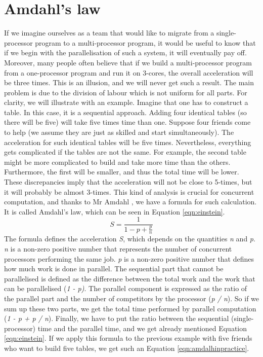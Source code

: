 \section{Amdahl's law}
\label{04:amdalhlaw}

If we imagine ourselves as a team that would like to migrate from a single-processor program to a multi-processor program, it would be useful to know that if we begin with the parallelisation of such a system, it will eventually pay off.
Moreover, many people often believe that if we build a multi-processor program from a one-processor program and run it on 3-cores, the overall acceleration will be three times.
This is an illusion, and we will never get such a result.
The main problem is due to the division of labour which is not uniform for all parts.
For clarity, we will illustrate with an example.
Imagine that one has to construct a table.
In this case, it is a sequential approach.
Adding four identical tables (so there will be five) will take five times time than one.
Suppose four friends come to help (we assume they are just as skilled and start simultaneously).
The acceleration for such identical tables will be five times.
Nevertheless, everything gets complicated if the tables are not the same.
For example, the second table might be more complicated to build and take more time than the others.
Furthermore, the first will be smaller, and thus the total time will be lower.
These discrepancies imply that the acceleration will not be close to 5-times, but it will probably be almost 3-times.
This kind of analysis is crucial for concurrent computation, and thanks to Mr Amdahl \cite{amdalh}, we have a formula for such calculation.
It is called Amdahl's law, which can be seen in Equation \eqref{eqn:einstein}.
\begin{equation}
    \label{eqn:einstein}
    S = \frac{1}{1 - p + \frac{p}{n}}
    \tag{1}
\end{equation}
The formula defines the acceleration \emph{S}, which depends on the quantities \emph{n} and \emph{p}. \emph{n} is a non-zero positive number that represents the number of concurrent processors performing the same job. \emph{p} is a non-zero positive number that defines how much work is done in parallel.
The sequential part that cannot be parallelised is defined as the difference between the total work and the work that can be parallelised (\emph{1 - p)}. The parallel component is expressed as the ratio of the parallel part and the number of competitors by the processor (\emph{p / n}).
So if we sum up these two parts, we get the total time performed by parallel computation (\emph{1 - p + p / n}). Finally, we have to put the ratio between the sequential (single-processor) time and the parallel time, and we get already mentioned Equation \ref{eqn:einstein}.
If we apply this formula to the previous example with five friends who want to build five tables, we get such an Equation \eqref{eqn:amdalhinpractice}.

